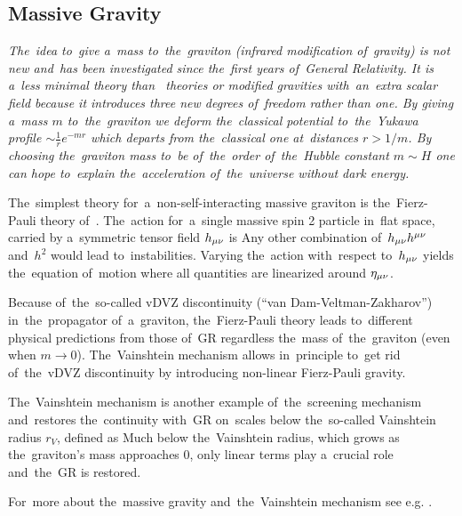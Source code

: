 \subsection{Massive Gravity}
{\itshape
The~idea to~give a~mass to~the~graviton (infrared modification of~gravity) is not new and~has been investigated since the~first years of~General Relativity. It is a~less minimal theory than \fR\ theories or modified gravities with~an~extra scalar field because it introduces three new degrees of~freedom rather than one. By giving a~mass $m$ to~the~graviton we deform the~classical potential to~the~Yukawa profile $\sim\frac1r e^{-mr}$ which departs from the~classical one at~distances $r>1/m$. By choosing the~graviton mass to~be of~the~order of~the~Hubble constant $m\sim H$ one can hope to~explain the~acceleration of~the~universe without dark energy.

The~simplest theory for~a~non-self-interacting massive graviton is the~Fierz-Pauli theory of~\textcite{1939RSPSA.173..211F}. The~action for~a~single massive spin 2 particle in~flat space, carried by a~symmetric tensor field $h_{\mu\nu}$ is
Any other combination of~$h_{\mu\nu} h^{\mu\nu}$ and~$h^2$ would lead to~instabilities. Varying the~action with~respect to~$h_{\mu\nu}$ yields the~equation of~motion
where all quantities are linearized around $\eta_{\mu\nu}$.

Because of~the~so-called vDVZ discontinuity (``van Dam-Veltman-Zakharov'') in~the~propagator of~a~graviton, the~Fierz-Pauli theory leads to~different physical predictions from those of~GR regardless the~mass of~the~graviton (even when $m\to0$). The~Vainshtein mechanism \parencite{1972PhLB...39..393V} allows in~principle to~get rid of~the~vDVZ discontinuity by introducing non-linear Fierz-Pauli gravity.

The~Vainshtein mechanism is another example of~the~screening mechanism and~restores the~continuity with~GR on~scales below the~so-called Vainshtein radius $r_V$, defined as
Much below the~Vainshtein radius, which grows as the~graviton's mass approaches $0$, only linear terms play a~crucial role and~the~GR is restored.

For~more about the~massive gravity and~the~Vainshtein mechanism see e.g. \textcite{2013CQGra..30r4001B,2012RvMP...84..671H}.
} %
